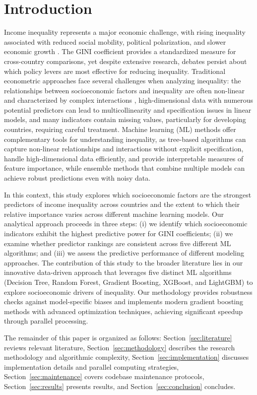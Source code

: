 \documentclass[10pt,twocolumn]{article}
\begin{document}
\section{Introduction}\label{sec:intro}
\par Income inequality represents a major economic challenge, with rising inequality associated with reduced social mobility, political polarization, and slower economic growth \cite{piketty2014capital,stiglitz2012price}. The GINI coefficient provides a standardized measure for cross-country comparisons, yet despite extensive research, debates persist about which policy levers are most effective for reducing inequality. Traditional econometric approaches face several challenges when analyzing inequality: the relationships between socioeconomic factors and inequality are often non-linear and characterized by complex interactions \cite{kuznets1955economic}, high-dimensional data with numerous potential predictors can lead to multicollinearity and specification issues in linear models, and many indicators contain missing values, particularly for developing countries, requiring careful treatment. Machine learning (ML) methods offer complementary tools for understanding inequality, as tree-based algorithms can capture non-linear relationships and interactions without explicit specification, handle high-dimensional data efficiently, and provide interpretable measures of feature importance, while ensemble methods that combine multiple models can achieve robust predictions even with noisy data.
\par In this context, this study explores which socioeconomic factors are the strongest predictors of income inequality across countries and the extent to which their relative importance varies across different machine learning models. Our analytical approach proceeds in three steps: (i) we identify which socioeconomic indicators exhibit the highest predictive power for GINI coefficients; (ii) we examine whether predictor rankings are consistent across five different ML algorithms; and (iii) we assess the predictive performance of different modeling approaches. The contribution of this study to the broader literature lies in our innovative data-driven approach that leverages five distinct ML algorithms (Decision Tree, Random Forest, Gradient Boosting, XGBoost, and LightGBM) to explore socioeconomic drivers of inequality. Our methodology provides robustness checks against model-specific biases and implements modern gradient boosting methods with advanced optimization techniques, achieving significant speedup through parallel processing.
\par The remainder of this paper is organized as follows: Section~\ref{sec:literature} reviews relevant literature, Section~\ref{sec:methodology} describes the research methodology and algorithmic complexity, Section~\ref{sec:implementation} discusses implementation details and parallel computing strategies, Section~\ref{sec:maintenance} covers codebase maintenance protocols, Section~\ref{sec:results} presents results, and Section~\ref{sec:conclusion} concludes.
\end{document}
